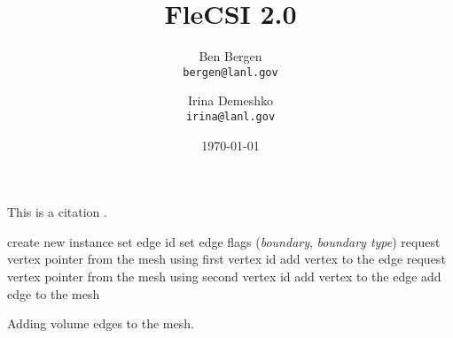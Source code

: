 \documentclass{article}
\title{FleCSI 2.0}
\author{
  Ben Bergen\\
  \texttt{bergen@lanl.gov}
  \and
  Irina Demeshko\\
  \texttt{irina@lanl.gov}
}
\date{\today}
\begin{document}
\maketitle




This is a citation \cite{LegeionSC12}.


\begin{algorithm}
  \begin{algorithmic}[1]
    \STATE create new instance
    \STATE set edge id
    \STATE set edge flags (\emph{boundary}, \emph{boundary type})
    \STATE request vertex pointer from the mesh using first vertex id
    \STATE add vertex to the edge
    \STATE request vertex pointer from the mesh using second vertex id
    \STATE add vertex to the edge
    \STATE add edge to the mesh
    \ENDFOR
  \end{algorithmic}
  \caption{Adding volume edges to the mesh.}
  \label{algo:volume_edge_assembly}
\end{algorithm}




\end{document}
